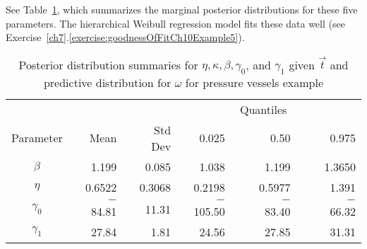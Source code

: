 \documentclass {book}
\begin{document}
See Table~\ref{ch10:tab7}, which summarizes the marginal posterior
distributions for these five parameters. The hierarchical Weibull
regression model fits these data well (see
Exercise~\ref{ch7}.\ref{exercise:goodnessOfFitCh10Example5}).

\begin{table}
\caption{Posterior distribution summaries for $\eta, \kappa,
\beta, \gamma_{0}$, and $\gamma_{1}$ given $\vec{t}$ and
predictive distribution for $\omega$ for pressure vessels
example}\label{ch10:tab7}

 \centering
\begin{tabular}{crrrrrrrrrrrr}
\hline     &             &       &       & &
 & & \multicolumn{3}{c}{Quantiles}  & &
 \\\cline{7-13}
  Parameter&\mbox{}&Mean&\mbox{}&Std
 Dev&\mbox{}\mbox{}\mbox{}
 &\multicolumn{1}{r}{0.025}&\mbox{}&\mbox{}&0.50 & \mbox{} &  \mbox{} & \multicolumn{1}{r}{0.975}\\
\hline%
    $\beta$&\mbox{} &   1.199 &\hspace{0.01in} &    0.085 &\hspace{0.01in} &        1.038 &\hspace{0.01in}  &\hspace{0.01in} &    1.199 &\hspace{0.01in} &    \hspace{0.01in} &   1.3650\\
    $\eta$&\mbox{} &    0.6522 &\hspace{0.01in} &   0.3068 &\hspace{0.01in} &       0.2198 &\hspace{0.01in} &\hspace{0.01in} &   0.5977 &\hspace{0.01in} &   \hspace{0.01in} &    1.391   \\
    $\gamma_0$&\mbox{} &    $-$84.81 &\hspace{0.01in} & 11.31 &\hspace{0.01in} &        $-$105.50 &\hspace{0.01in}  &\hspace{0.01in} &   $-$83.40 &\hspace{0.01in}  &\hspace{0.01in} & $-$66.32 \\
    $\gamma_1$&\mbox{} &    27.84 &\hspace{0.01in} &    1.81 &\hspace{0.01in} &     24.56 &\hspace{0.01in} &\hspace{0.01in} &    27.85 &\hspace{0.01in} &   \hspace{0.01in} &    31.31\\

\end{tabular}
\end{table}
\end{document}
